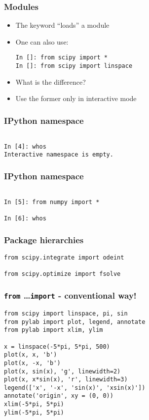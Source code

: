 \documentclass[14pt,compress]{beamer}
\newcommand{\kwrd}[1]{ \texttt{\textbf{\color{blue}{#1}}}  }
\begin{document}
\begin{frame}[fragile]
  \frametitle{Modules}
  \begin{itemize}
    \item The \kwrd{import} keyword ``loads'' a module
    \item One can also use:
      \begin{lstlisting}
In []: from scipy import *
In []: from scipy import linspace
      \end{lstlisting}    
    \item What is the difference?
    \item \alert{Use the former only in interactive mode}
    \end{itemize}
\end{frame}

\begin{frame}[fragile]
  \frametitle{IPython namespace}
  \begin{lstlisting}

In [4]: whos
Interactive namespace is empty.

  \end{lstlisting}
\end{frame}

\begin{frame}[fragile]
  \frametitle{IPython namespace}
  \begin{lstlisting}

In [5]: from numpy import *

In [6]: whos

  \end{lstlisting}
\end{frame}

\begin{frame}[fragile]
  \frametitle{Package hierarchies}
  \begin{lstlisting}
from scipy.integrate import odeint

from scipy.optimize import fsolve
  \end{lstlisting}
\end{frame}

\begin{frame}[fragile]
  \frametitle{\texttt{from} \ldots \texttt{import} - conventional way!}
  \small
  \begin{lstlisting}
from scipy import linspace, pi, sin
from pylab import plot, legend, annotate
from pylab import xlim, ylim

x = linspace(-5*pi, 5*pi, 500)
plot(x, x, 'b')
plot(x, -x, 'b')
plot(x, sin(x), 'g', linewidth=2)
plot(x, x*sin(x), 'r', linewidth=3)
legend(['x', '-x', 'sin(x)', 'xsin(x)'])
annotate('origin', xy = (0, 0))
xlim(-5*pi, 5*pi)
ylim(-5*pi, 5*pi)
  \end{lstlisting}
\end{frame}
\end{document}
